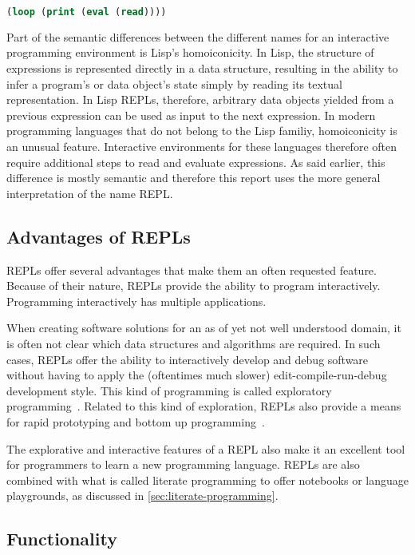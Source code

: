 \begin{lstlisting}[language=lisp]
(loop (print (eval (read))))
\end{lstlisting}

Part of the semantic differences between the different names for an interactive
programming environment is Lisp's homoiconicity. In Lisp, the structure of
expressions is represented directly in a data structure, resulting in the
ability to infer a program's or data object's state simply by reading its
textual representation. In Lisp REPLs, therefore, arbitrary data objects yielded
from a previous expression can be used as input to the next expression. In
modern programming languages that do not belong to the Lisp familiy,
homoiconicity is an unusual feature. Interactive environments for these
languages therefore often require additional steps to read and evaluate
expressions. As said earlier, this difference is mostly semantic and therefore
this report uses the more general interpretation of the name REPL.

\subsection{Advantages of REPLs}
\label{ssec:repl-advantages}
REPLs offer several advantages that make them an often requested feature.
Because of their nature, REPLs provide the ability to program interactively.
Programming interactively has multiple applications.

When creating software solutions for an as of yet not well understood domain,
it is often not clear which data structures and algorithms are required. In such
cases, REPLs offer the ability to interactively develop and debug software
without having to apply the (oftentimes much slower) edit-compile-run-debug
development style. This kind of programming is called exploratory
programming~\cite{Fritzson86}. Related to this kind of exploration, REPLs also
provide a means for rapid prototyping and bottom up programming~\cite{Graham93}.

The explorative and interactive features of a REPL also make it an excellent
tool for programmers to learn a new programming language. REPLs are also
combined with what is called literate programming to offer notebooks or language
playgrounds, as discussed in \cref{sec:literate-programming}.

\subsection{Functionality}
\label{sssec:repl-functionality}

